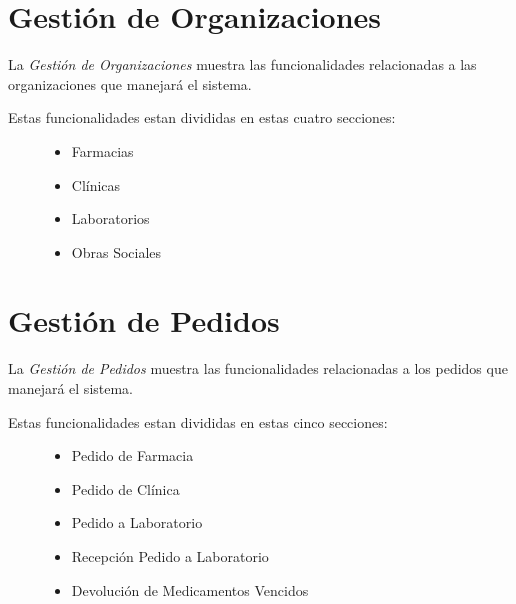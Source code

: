 \documentclass[a4paper,10pt,spanish]{sphinxmanual}
\begin{document}
\section{Gestión de Organizaciones}
\label{pantallaprincipal:gestion-de-organizaciones}\label{pantallaprincipal:gestion-organizaciones}
La \emph{Gestión de Organizaciones} muestra las funcionalidades relacionadas a las organizaciones que manejará el sistema.

\begin{description}
\item[{Estas funcionalidades estan divididas en estas cuatro secciones:}] \leavevmode\begin{itemize}
\item {} 
Farmacias

\item {} 
Clínicas

\item {} 
Laboratorios

\item {} 
Obras Sociales

\end{itemize}

\end{description}


\section{Gestión de Pedidos}
\label{pantallaprincipal:gestion-de-pedidos}\label{pantallaprincipal:gestion-pedidos}
La \emph{Gestión de Pedidos} muestra las funcionalidades relacionadas a los pedidos que manejará el sistema.

\begin{description}
\item[{Estas funcionalidades estan divididas en estas cinco secciones:}] \leavevmode\begin{itemize}
\item {} 
Pedido de Farmacia

\item {} 
Pedido de Clínica

\item {} 
Pedido a Laboratorio

\item {} 
Recepción Pedido a Laboratorio

\item {} 
Devolución de Medicamentos Vencidos

\end{itemize}

\end{description}
\end{document}
